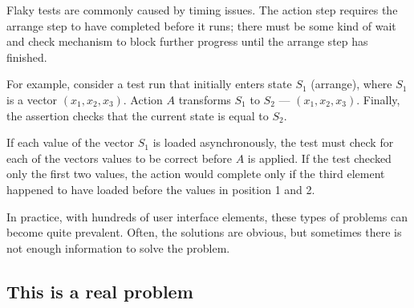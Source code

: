 Flaky tests are commonly caused by timing issues. The action step requires the arrange step to have completed before it runs; there must be some kind of wait and check mechanism to block further progress until the arrange step has finished.

For example, consider a test run that initially enters state $S_{1}$ (arrange), where $S_{1}$ is a vector $(x_{1},x_{2},x_{3})$. Action $A$ transforms $S_1$ to $S_2$ --- $(x_{1},x_{2},x_{3})$. Finally, the assertion checks that the current state is equal to $S_2$.

If each value of the vector $S_{1}$ is loaded asynchronously, the test must check for each of the vectors values to be correct before $A$ is applied. If the test checked only the first two values, the action would complete only if the third element happened to have loaded before the values in position 1 and 2.

In practice, with hundreds of user interface elements, these types of problems can become quite prevalent. Often, the solutions are obvious, but sometimes there is not enough information to solve the problem.

\subsection{This is a real problem}

